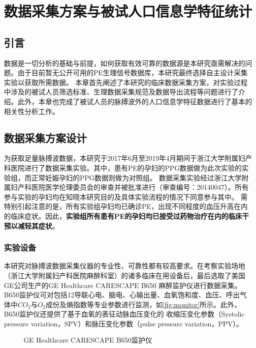 \chapter{数据采集方案与被试人口信息学特征统计}
\section{引言}
数据是一切分析的基础与前提，如何获取有效可靠的数据源是本研究亟需解决的问题。由于目前暂无公开可用的PE生理信号数据库，本研究最终选择自主设计采集实验以获取所需数据。
本章首先阐述了本研究的临床数据采集方案，对实验过程中涉及的被试人员筛选标准、生理数据采集规范及数据导出流程等问题进行了介绍。此外，本章也完成了被试人员的脉搏波外的人口信息学特征数据进行了基本的相关性分析工作。
\section{数据采集方案设计}
为获取足量脉搏波数据，本研究于2017年6月至2019年4月期间于浙江大学附属妇产科医院进行了数据采集实验。其中，患有PE的孕妇的PPG数据做为此次实验的实验组，而正常妊娠孕妇的PPG数据则做为对照组。
数据采集实验经过浙江大学附属妇产科医院医学伦理委员会的审查并被批准进行（审查编号：20140047）。所有参与实验的孕妇均在知晓本研究目的及具体实验流程的情况下同意参与其中。
需特别引起注意的是，所有实验组孕妇均已确诊PE，出现不同程度的血压升高在内的临床症状。因此，\textbf{实验组所有患有PE的孕妇均已接受过药物治疗在内的临床干预以减轻其症状}。
\subsection{实验设备}
本研究对脉搏波数据采集仪器的专业性、可靠性都有较高要求。在考察实验场地（浙江大学附属妇产科医院麻醉科室）的诸多临床在用设备后，最后选取了美国GE公司生产的GE Healthcare CARESCAPE B650 麻醉监护仪进行数据采集。
B650监护仪可对包括12导联心电、脑电、心输出量、血氧饱和度、血压、呼出气体中$CO_{2}$与$O_{2}$成份及熵指数等专业参数进行监测，如\autoref{fig:monitor}所示。此外，B650监护仪还提供了基于血氧的表征动脉血压变化的
收缩压变化参数（Systolic pressure variation，SPV）和脉压变化参数（pulse pressure variation，PPV）\cite{GE2021,Michard1999}。
\begin{figure}[htbp]
      \centering
      \quad
      \caption{\label{fig:monitor}GE Healthcare CARESCAPE B650监护仪}
\end{figure}

